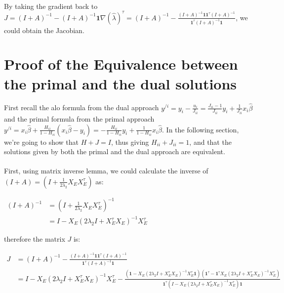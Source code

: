 \documentclass{article}
\begin{document}
\paragraph{}By taking the gradient back to $J = (I+A)^{-1} -(I+A)^{-1}\textbf{1}\nabla(\hat{\lambda})^{\tau} = (I+A)^{-1} -\frac{(I+A)^{-1}\textbf{1}\textbf{1}^{\tau}(I+A)^{-1}}{\textbf{1}^{\tau}(I+A)^{-1}\textbf{1}}$, we could obtain the Jacobian.
\section{Proof of the Equivalence between the primal and the dual solutions}
\paragraph{}First recall the alo formula from the dual approach $y^{/i} = y_{i}-\frac{u_{i}}{J_{ii}} = \frac{J_{ii}-1}{J_{ii}}y_{i}+\frac{1}{J_{ii}}x_{i}\hat{\beta}$ and the primal formula from the primal approach $y^{/i} = x_{i}\hat{\beta} + \frac{H_{ii}}{1-H_{ii}}(x_{i}\hat{\beta}-y_{i}) = -\frac{H_{ii}}{1-H_{ii}}y_{i}+\frac{1}{1-H_{ii}}x_{i}\hat{\beta}$. In the following section, we're going to show that $H+J =I$, thus giving $H_{ii}+J_{ii} = 1$, and that the solutions given by both the primal and the dual approach are equivalent.
\paragraph{}First, using matrix inverse lemma, we could calculate the inverse of $(I+A) = (I+\frac{1}{2\lambda_{2}}X_{E}X_{E}^{\tau})$ as:
\begin{center}
$\begin{aligned}
(I+A)^{-1} &= (I+\frac{1}{2\lambda_{2}}X_{E}X_{E}^{\tau})^{-1}\\
&= I - X_{E}(2\lambda_{2}I+X_{E}^{\tau}X_{E})^{-1}X_{E}^{\tau}
\end{aligned}
$
\end{center}
therefore the matrix $J$ is:
\begin{center}
$
\begin{aligned}
J &= (I+A)^{-1} -\frac{(I+A)^{-1}\textbf{1}\textbf{1}^{\tau}(I+A)^{-1}}{\textbf{1}^{\tau}(I+A)^{-1}\textbf{1}}\\
&= I - X_{E}(2\lambda_{2}I+X_{E}^{\tau}X_{E})^{-1}X_{E}^{\tau} - \frac{(\textbf{1}-X_{E}(2\lambda_{2}I+X_{E}^{\tau}X_{E})^{-1}X_{E}^{\tau}\textbf{1})(\textbf{1}^{\tau}-\textbf{1}^{\tau}X_{E}(2\lambda_{2}I+X_{E}^{\tau}X_{E})^{-1}X_{E}^{\tau})}{\textbf{1}^{\tau}(I-X_{E}(2\lambda_{2}I+X_{E}^{\tau}X_{E})^{-1}X_{E}^{\tau})\textbf{1}}
\end{aligned}
$
\end{center}
\end{document}
